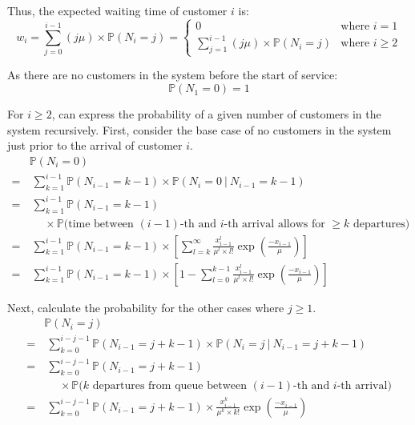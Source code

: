 Thus, the expected waiting time of customer $i$ is:
\begin{equation}
	w_{i} = \sum_{j = 0}^{i - 1} (j \mu) \times \mathbb{P} (N_{i} = j) = \begin{cases} 0 & \text{where $i = 1$} \\ \sum_{j = 1}^{i - 1} (j \mu) \times \mathbb{P} (N_{i} = j) & \text{where $i \geq 2$} \end{cases}
	\label{eqn:StaticWaiting}
\end{equation}

As there are no customers in the system before the start of service:
\begin{equation}
	\mathbb{P} (N_{1} = 0) = 1
\end{equation}

For $i \geq 2$, can express the probability of a given number of customers in the system recursively. First, consider the base case of no customers in the system just prior to the arrival of customer $i$.
\begin{align*}
	& \mathbb{P} (N_{i} = 0) \\
	= & \ \sum_{k = 1}^{i - 1} \mathbb{P} (N_{i - 1} = k - 1) \times \mathbb{P} (N_{i} = 0 \ | \ N_{i - 1} = k - 1) \\
	= & \ \sum_{k = 1}^{i - 1} \mathbb{P} (N_{i - 1} = k - 1) \\
	& \ \ \ \ \ \ \times \mathbb{P} \Big( \text{time between $(i - 1)$-th and $i$-th arrival allows for $\geq k$ departures} \Big) \\
	= & \ \sum_{k = 1}^{i - 1} \mathbb{P} (N_{i - 1} = k - 1) \times \left[ \sum_{l = k}^{\infty} \frac{x_{i - 1}^{l}}{\mu^{l} \times l!} \exp \left( \frac{- x_{i - 1}}{\mu} \right) \right] \\
	= & \ \sum_{k = 1}^{i - 1} \mathbb{P} (N_{i - 1} = k - 1) \times \left[ 1 - \sum_{l = 0}^{k - 1} \frac{x_{i - 1}^{l}}{\mu^{l} \times l!} \exp \left( \frac{- x_{i - 1}}{\mu} \right) \right]
\end{align*}

Next, calculate the probability for the other cases where $j \geq 1$.
\begin{align*}
	& \mathbb{P} (N_{i} = j) \\
	= & \ \sum_{k = 0}^{i - j - 1} \mathbb{P} (N_{i - 1} = j + k - 1) \times \mathbb{P} (N_{i} = j \ | \ N_{i - 1} = j + k - 1) \\
	= & \ \sum_{k = 0}^{i - j - 1} \mathbb{P} (N_{i - 1} = j + k - 1) \\
	& \ \ \ \ \ \ \times \mathbb{P} \Big( \text{$k$ departures from queue between $(i - 1)$-th and $i$-th arrival} \Big) \\
	= & \ \sum_{k = 0}^{i - j - 1} \mathbb{P} (N_{i - 1} = j + k - 1) \times \frac{x_{i - 1}^{k}}{\mu^{k} \times k!} \exp \left( \frac{- x_{i - 1}}{\mu} \right)
\end{align*}


